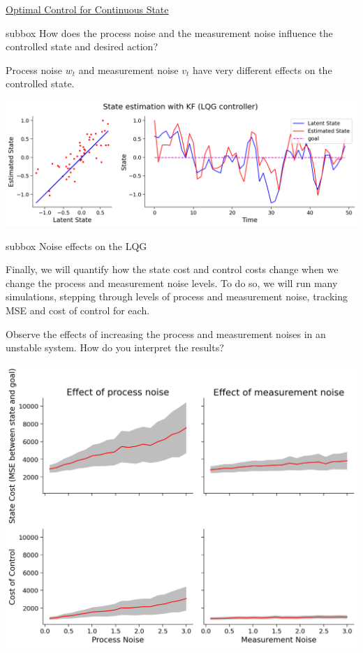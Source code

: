 \begin{textbox}{\href{https://compneuro.neuromatch.io/tutorials/W3D3_OptimalControl/student/W3D3_Tutorial2.html}{Optimal Control for Continuous State}}
\begin{subbox}{subbox}{  How does the process noise and the measurement noise influence the controlled state and desired action?}
\scriptsize

Process noise $w_t$ and measurement noise $v_t$ have very different effects on the controlled state. 


\begin{center}
    
\includegraphics[scale=0.2]{Figures/OC/OC_Figure15.png}
\end{center}


\end{subbox}

\begin{subbox}{subbox}{  Noise effects on the LQG}
\scriptsize

Finally, we will quantify how the state cost and control costs change when we change the process and measurement noise levels. To do so, we will run many simulations, stepping through levels of process and measurement noise, tracking MSE and cost of control for each. 

Observe the effects of increasing the process and measurement noises in an unstable system. How do you interpret the results?

\begin{center}
    
\includegraphics[scale=0.2]{Figures/OC/OC_Figure16.png}
\end{center}


\end{subbox}
\end{textbox}
